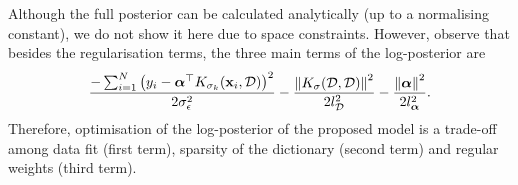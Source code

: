 Although the full posterior can be calculated analytically (up to a normalising constant), we do not show it here due to space constraints. However, observe that besides the regularisation terms, the three main terms of the log-posterior are
\begin{equation*}
\begin{split}
  \frac{-\sum_{i=1}^{N} \left(y_i - {\boldsymbol{\alpha}}^\top K_{\sigma_k}(\mathbf{x}_i, \mathcal{D})\right)^2}{2\sigma_\epsilon^2} -\frac{\left\|K_\sigma(\mathcal{D},\mathcal{D}) \right\|^2}{2 l_{\mathcal{D}}^2} -\frac{\left\|{\boldsymbol{\alpha}} \right\|^2}{2 l_{\boldsymbol{\alpha}}^2}.
\end{split}
\label{eq:log-posterior}
\end{equation*}
Therefore, optimisation of the log-posterior of the proposed model is a trade-off among data fit (first term), sparsity of the dictionary (second term) and regular weights (third term). 


